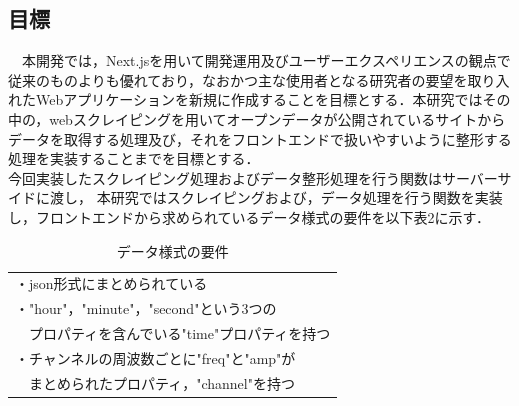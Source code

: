 \subsection{目標}
　本開発では，Next.jsを用いて開発運用及びユーザーエクスペリエンスの観点で従来のものよりも優れており，なおかつ主な使用者となる研究者の要望を取り入れたWebアプリケーションを新規に作成することを目標とする．本研究ではその中の，webスクレイピングを用いてオープンデータが公開されているサイトからデータを取得する処理及び，それをフロントエンドで扱いやすいように整形する処理を実装することまでを目標とする．\\
 今回実装したスクレイピング処理およびデータ整形処理を行う関数はサーバーサイドに渡し，
 本研究ではスクレイピングおよび，データ処理を行う関数を実装し，フロントエンドから求められているデータ様式の要件を以下表2に示す． \\
 \begin{table}[h]
  \centering
  \caption{データ様式の要件}
  \begin{tabular}{l}
  \toprule
     ・json形式にまとめられている\\
     ・"hour"，"minute"，"second"という3つの\\
     　プロパティを含んでいる"time"プロパティを持つ\\
     ・チャンネルの周波数ごとに"freq"と"amp"が\\
     　まとめられたプロパティ，"channel"を持つ\\
  \end{tabular}
\end{table}

